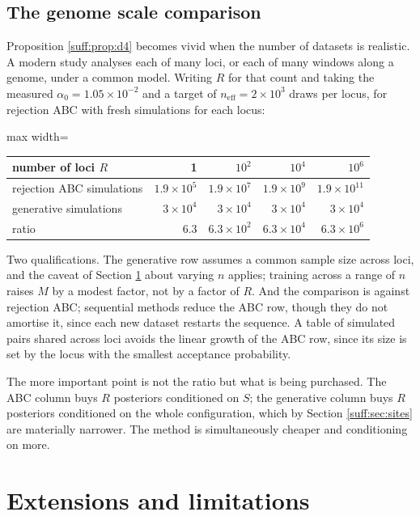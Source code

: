 \subsection{The genome scale comparison}

Proposition \ref{suff:prop:d4} becomes vivid when the number of datasets is realistic. A modern
study analyses each of many loci, or each of many windows along a genome, under a common
model. Writing $R$ for that count and taking the measured $\alpha_0=1.05\times10^{-2}$ and a
target of $n_{\mathrm{eff}}=2\times10^3$ draws per locus, for rejection ABC with fresh simulations for each locus:

\begin{center}
\begin{adjustbox}{max width=\textwidth}
\begin{tabular}{lrrrr}
\toprule
number of loci $R$ & 1 & $10^2$ & $10^4$ & $10^6$ \\
\midrule
rejection ABC simulations & $1.9\times10^5$ & $1.9\times10^7$ & $1.9\times10^9$ &
$1.9\times10^{11}$ \\
generative simulations & $3\times10^4$ & $3\times10^4$ & $3\times10^4$ & $3\times10^4$ \\
ratio & $6.3$ & $6.3\times10^{2}$ & $6.3\times10^{4}$ & $6.3\times10^{6}$ \\
\bottomrule
\end{tabular}
\end{adjustbox}
\end{center}

Two qualifications. The generative row assumes a common sample size across loci, and the
caveat of Section \ref{suff:sec:ext} about varying $n$ applies; training across a range of $n$
raises $M$ by a modest factor, not by a factor of $R$. And the comparison is against rejection
ABC; sequential methods reduce the ABC row, though they do not amortise it, since each new
dataset restarts the sequence. A table of simulated pairs shared across loci avoids the linear growth of the ABC row, since its size is set by the locus with the smallest acceptance probability.

The more important point is not the ratio but what is being purchased. The ABC column buys
$R$ posteriors conditioned on $S$; the generative column buys $R$ posteriors conditioned on
the whole configuration, which by Section \ref{suff:sec:sites} are materially narrower. The
method is simultaneously cheaper and conditioning on more.

\section{Extensions and limitations}
\label{suff:sec:ext}

